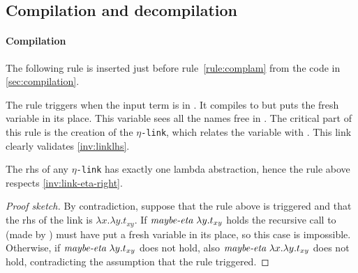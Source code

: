 \documentclass[sigconf,natbib=false,review]{acmart}
\newcommand{\appsep}{\ensuremath{\textcolor{lightgray}{\cdot}}}
\newcommand{\linkMacro}[1]{\ensuremath{#1}\texttt{-link}\xspace}
\newcommand{\linketa} {\linkMacro{\eta}}
\newcommand{\Ho}{\texorpdfstring{\ensuremath{\mathcal{H}_o}\xspace}{Ho}}
\newcommand{\rhs}{rhs\xspace}
\begin{document}

% 


\subsection{Compilation and decompilation}\label{sec:etacomp}


\paragraph{Compilation}
The following rule is inserted just before rule~\ref{rule:complam} from the code in
\cref{sec:compilation}.



\noindent
The rule triggers when the input term  is in
\maybeeta. It compiles  to  but puts the fresh
variable  in its place. This variable sees all the names free in
. The critical part of this rule is the creation of the \linketa,
which relates the variable  with .
This link clearly validates \cref{inv:linklhs}.

\begin{corollary}
  The \rhs of any \linketa has exactly one lambda abstraction, hence
  the rule above respects \cref{inv:link-eta-right}.
  \label{cor:rhs-eta-onelamb}
\end{corollary}

\begin{proof}[Proof sketch]
  By contradiction, suppose that the rule above is triggered and that
  the \rhs of the link is $\lambda x.\lambda y.t_{xy}$.
  If $\emph{maybe-eta}{}~\lambda y.t_{xy}$ holds the recursive call to
   (made by ) must have put a fresh variable
  in its place, so this case is impossible.
  Otherwise, if $\emph{maybe-eta}{}~\lambda y.t_{xy}$ does not hold, also
  $\emph{maybe-eta}{}~\lambda x.\lambda y.t_{xy}$ does not hold, contradicting
  the assumption that the rule triggered.
\end{proof}
\end{document}
